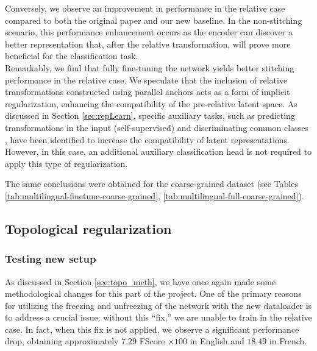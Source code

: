 \documentclass[../main.tex]{subfiles}
\begin{document}
Conversely, we observe an improvement in performance in the relative case compared to both the original paper and our new baseline. In the non-stitching scenario, this performance enhancement occurs as the encoder can discover a better representation that, after the relative transformation, will prove more beneficial for the classification task.\\

Remarkably, we find that fully fine-tuning the network yields better stitching performance in the relative case. We speculate that the inclusion of relative transformations constructed using parallel anchors acts as a form of implicit regularization, enhancing the compatibility of the pre-relative latent space. As discussed in Section \ref{sec:repLearn}, specific auxiliary tasks, such as predicting transformations in the input (self-supervised) and discriminating common classes \cite{gygli_towards_2020}, have been identified to increase the compatibility of latent representations. However, in this case, an additional auxiliary classification head is not required to apply this type of regularization.

\begin{note_math}
The same conclusions were obtained for the coarse-grained dataset (see Tables \ref{tab:multilingual-finetune-coarse-grained}, \ref{tab:multilingual-full-coarse-grained}).
\end{note_math}

\subsection{Topological regularization}
\subsubsection*{Testing new setup}

As discussed in Section \ref{sec:topo_meth}, we have once again made some methodological changes for this part of the project. One of the primary reasons for utilizing the freezing and unfreezing of the network with the new dataloader is to address a crucial issue: without this ``fix,'' we are unable to train in the relative case. In fact, when this fix is not applied, we observe a significant performance drop, obtaining approximately $7.29$ FScore $\times 100$ in English and $18.49$ in French.\\
\end{document}
